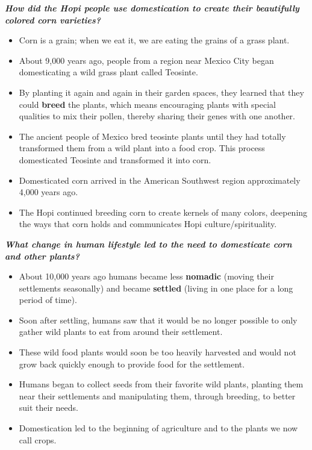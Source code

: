 \documentclass[12pt,]{article}
\providecommand{\tightlist}{%
  \setlength{\itemsep}{0pt}\setlength{\parskip}{0pt}}
\begin{document}
\textbf{\emph{How did the Hopi people use domestication to create their beautifully colored corn varieties?}}

\begin{itemize}
\tightlist
\item
  Corn is a grain; when we eat it, we are eating the grains of a grass plant.
\item
  About 9,000 years ago, people from a region near Mexico City began domesticating a wild grass plant called Teosinte.
\item
  By planting it again and again in their garden spaces, they learned that they could \textbf{breed} the plants, which means encouraging plants with special qualities to mix their pollen, thereby sharing their genes with one another.
\item
  The ancient people of Mexico bred teosinte plants until they had totally transformed them from a wild plant into a food crop. This process domesticated Teosinte and transformed it into corn.
\item
  Domesticated corn arrived in the American Southwest region approximately 4,000 years ago.
\item
  The Hopi continued breeding corn to create kernels of many colors, deepening the ways that corn holds and communicates Hopi culture/spirituality.
\end{itemize}

\textbf{\emph{What change in human lifestyle led to the need to domesticate corn and other plants? }}

\begin{itemize}
\tightlist
\item
  About 10,000 years ago humans became less \textbf{nomadic} (moving their settlements seasonally) and became \textbf{settled} (living in one place for a long period of time).
\item
  Soon after settling, humans saw that it would be no longer possible to only gather wild plants to eat from around their settlement.
\item
  These wild food plants would soon be too heavily harvested and would not grow back quickly enough to provide food for the settlement.
\item
  Humans began to collect seeds from their favorite wild plants, planting them near their settlements and manipulating them, through breeding, to better suit their needs.
\item
  Domestication led to the beginning of agriculture and to the plants we now call crops.
\end{itemize}
\end{document}
